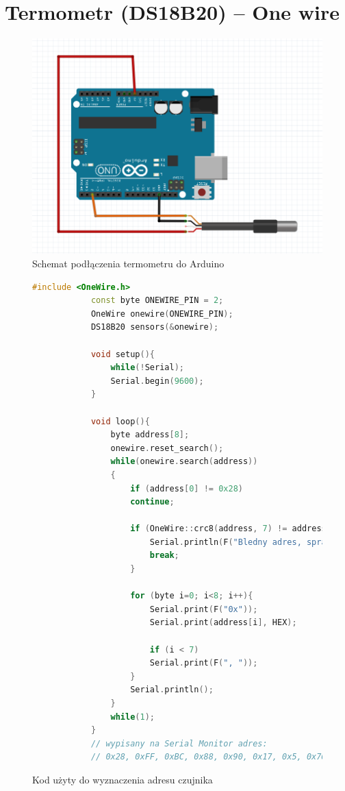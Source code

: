 \documentclass[polish,a4paper]{article}
\begin{document}
	\section{Termometr (DS18B20) – One wire}
	\begin{figure}[h!]
		\begin{center}
			\includegraphics[scale=0.42]{01_temp_sensor.png}
			\caption*{Schemat podłączenia termometru do Arduino}
		\end{center}
	\end{figure}
	\begin{figure}[h!]
		\begin{lstlisting}[language=C++, basicstyle=\tiny]
			#include <OneWire.h>
			const byte ONEWIRE_PIN = 2;
			OneWire onewire(ONEWIRE_PIN);
			DS18B20 sensors(&onewire);
			
			void setup(){
				while(!Serial);
				Serial.begin(9600);
			}
			
			void loop(){
				byte address[8];
				onewire.reset_search();
				while(onewire.search(address))
				{
					if (address[0] != 0x28)
					continue;
					
					if (OneWire::crc8(address, 7) != address[7]){
						Serial.println(F("Bledny adres, sprawdz polaczenia"));
						break;
					}
					
					for (byte i=0; i<8; i++){
						Serial.print(F("0x"));
						Serial.print(address[i], HEX);
						
						if (i < 7)
						Serial.print(F(", "));
					}
					Serial.println();
				}
				while(1);
			}
			// wypisany na Serial Monitor adres:
			// 0x28, 0xFF, 0xBC, 0x88, 0x90, 0x17, 0x5, 0x76
		\end{lstlisting}
		\caption*{Kod użyty do wyznaczenia adresu czujnika}
	\end{figure}
	
\end{document}
